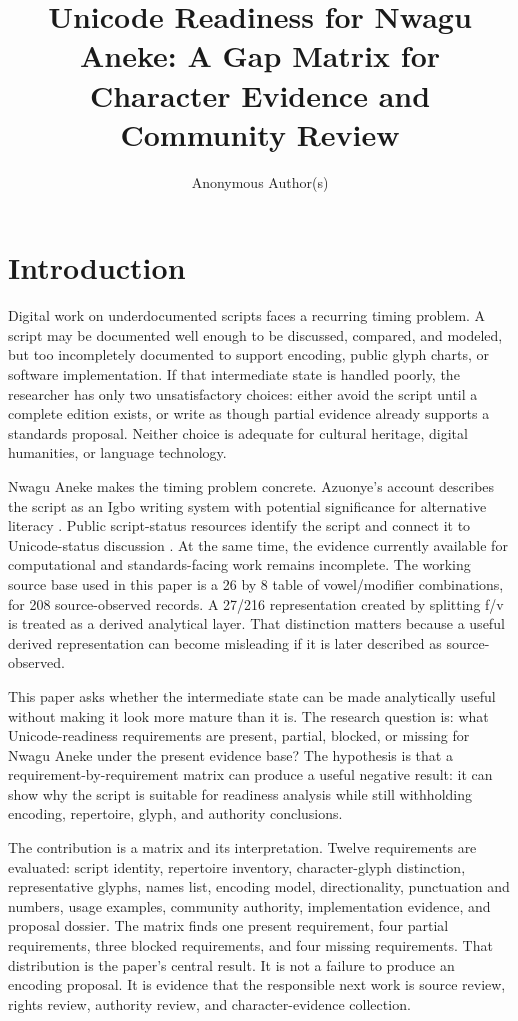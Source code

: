 \documentclass[sigconf,nonacm]{acmart}
\title{Unicode Readiness for Nwagu Aneke: A Gap Matrix for Character Evidence and Community Review}
\author{Anonymous Author(s)}
\affiliation{\institution{Independent research manuscript}\country{Nigeria}}
\begin{document}
\maketitle

\section{Introduction}
Digital work on underdocumented scripts faces a recurring timing problem. A
script may be documented well enough to be discussed, compared, and modeled, but
too incompletely documented to support encoding, public glyph charts, or
software implementation. If that intermediate state is handled poorly, the
researcher has only two unsatisfactory choices: either avoid the script until a
complete edition exists, or write as though partial evidence already supports a
standards proposal. Neither choice is adequate for cultural heritage, digital
humanities, or language technology.

Nwagu Aneke makes the timing problem concrete. Azuonye's account describes the
script as an Igbo writing system with potential significance for alternative
literacy \cite{azuonye1992}. Public script-status resources identify the script
and connect it to Unicode-status discussion \cite{omniglotNwagu,scriptSourceNwagu}.
At the same time, the evidence currently available for computational and
standards-facing work remains incomplete. The working source base used in this
paper is a 26 by 8 table of vowel/modifier combinations, for 208
source-observed records. A 27/216 representation created by splitting f/v is
treated as a derived analytical layer. That distinction matters because a useful
derived representation can become misleading if it is later described as
source-observed.

This paper asks whether the intermediate state can be made analytically useful
without making it look more mature than it is. The research question is: what
Unicode-readiness requirements are present, partial, blocked, or missing for
Nwagu Aneke under the present evidence base? The hypothesis is that a
requirement-by-requirement matrix can produce a useful negative result: it can
show why the script is suitable for readiness analysis while still withholding
encoding, repertoire, glyph, and authority conclusions.

The contribution is a matrix and its interpretation. Twelve requirements are
evaluated: script identity, repertoire inventory, character-glyph distinction,
representative glyphs, names list, encoding model, directionality, punctuation
and numbers, usage examples, community authority, implementation evidence, and
proposal dossier. The matrix finds one present requirement, four partial
requirements, three blocked requirements, and four missing requirements. That
distribution is the paper's central result. It is not a failure to produce an
encoding proposal. It is evidence that the responsible next work is source
review, rights review, authority review, and character-evidence collection.
\end{document}
